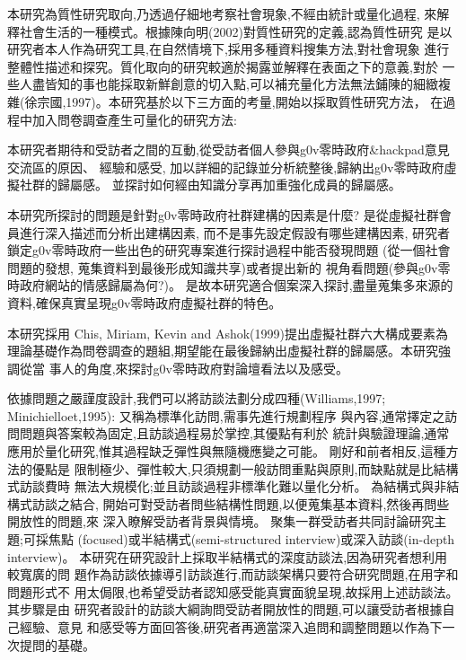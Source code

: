 
本研究為質性研究取向,乃透過仔細地考察社會現象,不經由統計或量化過程,
來解釋社會生活的一種模式。根據陳向明(2002)對質性研究的定義,認為質性研究
是以研究者本人作為研究工具,在自然情境下,採用多種資料搜集方法,對社會現象
進行整體性描述和探究。質化取向的研究較適於揭露並解釋在表面之下的意義,對於
一些人盡皆知的事也能採取新鮮創意的切入點,可以補充量化方法無法鋪陳的細緻複
雜(徐宗國,1997)。本研究基於以下三方面的考量,開始以採取質性研究方法，
在過程中加入問卷調查產生可量化的研究方法:

本研究者期待和受訪者之間的互動,從受訪者個人參與g0v零時政府\&hackpad意見交流區的原因、
經驗和感受,
加以詳細的記錄並分析統整後,歸納出g0v零時政府虛擬社群的歸屬感。
並探討如何經由知識分享再加重強化成員的歸屬感。


本研究所探討的問題是針對g0v零時政府社群建構的因素是什麼?
是從虛擬社群會員進行深入描述而分析出建構因素,
而不是事先設定假設有哪些建構因素,
研究者鎖定g0v零時政府一些出色的研究專案進行探討過程中能否發現問題
(從一個社會問題的發想, 蒐集資料到最後形成知識共享)或者提出新的
視角看問題(參與g0v零時政府網站的情感歸屬為何?)。
是故本研究適合個案深入探討,盡量蒐集多來源的資料,確保真實呈現g0v零時政府虛擬社群的特色。

本研究採用 Chis, Miriam, Kevin and Ashok(1999)提出虛擬社群六大構成要素為
理論基礎作為問卷調查的題組,期望能在最後歸納出虛擬社群的歸屬感。本研究強調從當
事人的角度,來探討g0v零時政府對論壇看法以及感受。





依據問題之嚴謹度設計,我們可以將訪談法劃分成四種(Williams,1997;
Minichielloet,1995):
又稱為標準化訪問,需事先進行規劃程序
與內容,通常擇定之訪問問題與答案較為固定,且訪談過程易於掌控,其優點有利於
統計與驗證理論,通常應用於量化研究,惟其過程缺乏彈性與無隨機應變之可能。
剛好和前者相反,這種方法的優點是
限制極少、彈性較大,只須規劃一般訪問重點與原則,而缺點就是比結構式訪談費時
無法大規模化;並且訪談過程非標準化難以量化分析。
為結構式與非結構式訪談之結合,
開始可對受訪者問些結構性問題,以便蒐集基本資料,然後再問些開放性的問題,來
深入瞭解受訪者背景與情境。
聚集一群受訪者共同討論研究主題;可採焦點
(focused)或半結構式(semi-structured interview)或深入訪談(in-depth interview)。
本研究在研究設計上採取半結構式的深度訪談法,因為研究者想利用較寬廣的問
題作為訪談依據導引訪談進行,而訪談架構只要符合研究問題,在用字和問題形式不
用太侷限,也希望受訪者認知感受能真實面貌呈現,故採用上述訪談法。其步驟是由
研究者設計的訪談大綱詢問受訪者開放性的問題,可以讓受訪者根據自己經驗、意見
和感受等方面回答後,研究者再適當深入追問和調整問題以作為下一次提問的基礎。




